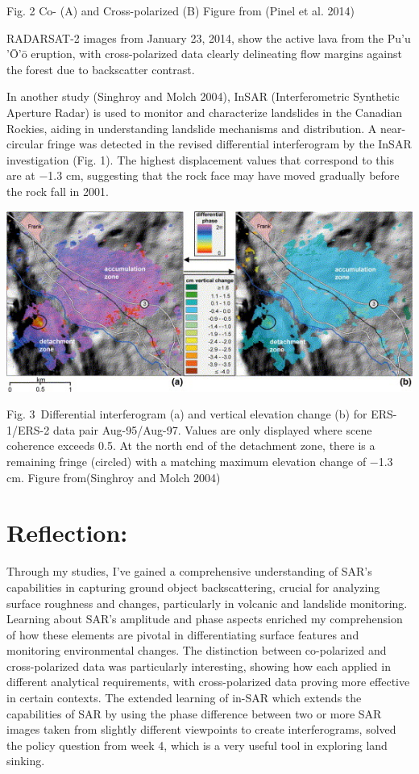 \documentclass[
  letterpaper,
  DIV=11,
  numbers=noendperiod]{scrreprt}
\begin{document}
Fig. 2 Co- (A) and Cross-polarized (B) Figure from (Pinel et al. 2014)

RADARSAT-2 images from January 23, 2014, show the active lava from the
Pu'u 'Ō'ō eruption, with cross-polarized data clearly delineating flow
margins against the forest due to backscatter contrast.

In another study (Singhroy and Molch 2004), InSAR (Interferometric
Synthetic Aperture Radar) is used to monitor and characterize landslides
in the Canadian Rockies, aiding in understanding landslide mechanisms
and distribution. A near-circular fringe was detected in the revised
differential interferogram by the InSAR investigation (Fig. 1). The
highest displacement values that correspond to this are at −1.3 cm,
suggesting that the rock face may have moved gradually before the rock
fall in 2001.

\includegraphics{in-SAR.png}

Fig. 3~Differential interferogram (a) and vertical elevation change (b)
for ERS-1/ERS-2 data pair Aug-95/Aug-97. Values are only displayed where
scene coherence exceeds 0.5. At the north end of the detachment zone,
there is a remaining fringe (circled) with a matching maximum elevation
change of −1.3 cm. Figure from(Singhroy and Molch 2004)


\chapter{Reflection:}\label{reflection-5}

Through my studies, I've gained a comprehensive understanding of SAR's
capabilities in capturing ground object backscattering, crucial for
analyzing surface roughness and changes, particularly in volcanic and
landslide monitoring. Learning about SAR's amplitude and phase aspects
enriched my comprehension of how these elements are pivotal in
differentiating surface features and monitoring environmental changes.
The distinction between co-polarized and cross-polarized data was
particularly interesting, showing how each applied in different
analytical requirements, with cross-polarized data proving more
effective in certain contexts. The extended learning of in-SAR which
extends the capabilities of SAR by using the phase difference between
two or more SAR images taken from slightly different viewpoints to
create interferograms, solved the policy question from week 4, which is
a very useful tool in exploring land sinking.
\end{document}
